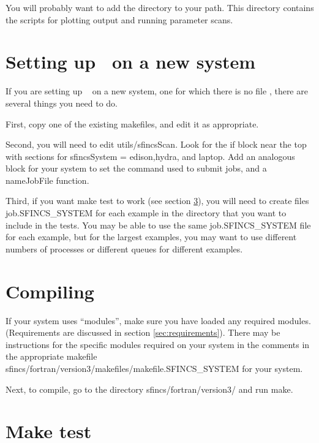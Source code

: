 You will probably want to add the directory  to your
path.  This directory contains the scripts for plotting output and running parameter scans.

\section{Setting up \sfincs~on a new system}
If you are setting up \sfincs~ on a new system, one for which there is no file
,
there are several things you need to do.

First, copy one of the existing makefiles, and edit it as appropriate.

Second, you will need to edit {\ttfamily utils/sfincsScan}. Look for the {\ttfamily if} block near the top
with sections for {\ttfamily sfincsSystem = edison},{\ttfamily hydra}, and {\ttfamily laptop}. Add an analogous block
for your system to set the command used to submit jobs, and a {\ttfamily nameJobFile} function.

Third, if you want {\ttfamily make test} to work (see section \ref{sec:maketest}),
you will need to create files {\ttfamily job.SFINCS\_SYSTEM}
for each example in the  directory that you want to include
in the tests.  You may be able to use the same {\ttfamily job.SFINCS\_SYSTEM} file for each example, but for the largest examples,
you may want to use different numbers of processes or different queues for different examples.

\section{Compiling}

If your system uses ``modules'', make sure you have loaded any required modules.
(Requirements are discussed in section \ref{sec:requirements}).  
There may be
instructions for the specific modules required on your system in the comments in the
appropriate makefile \\{\ttfamily sfincs/fortran/version3/makefiles/makefile.SFINCS\_SYSTEM} for your system.

Next, to compile, go to the directory {\ttfamily sfincs/fortran/version3/} and run {\ttfamily make}.

\section{Make test}
\label{sec:maketest}

